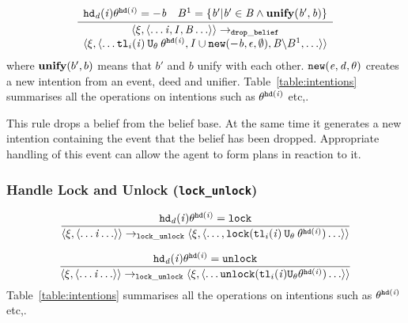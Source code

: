 \begin{equation}
\frac{
\begin{array}{c}
\mathit{{\tt hd}_d}(\mathit{i})\theta^{{\tt hd}(\mathit{i})} = -\mathit{b} \quad
B^1 = \{\mathit{b}' | \mathit{b}' \in \mathit{B} \wedge
\mbox{{\bf unify}}(\mathit{b}', \mathit{b})\}
\end{array}
}{
\begin{array}{c}
\langle \xi, \langle \ldots \mathit{i}, \mathit{I}, \mathit{B} \ldots \rangle \rangle \rightarrow_{\tt drop\_belief} \\
\langle \xi, \langle \ldots
{\tt tl}_i(\mathit{i})\: {\tt U}_{\theta} \:
\theta^{{\tt hd}(\mathit{i})},
\mathit{I} \cup {\tt new}(\mathit{-\mathit{b}}, \epsilon, \emptyset) ,
\mathit{B} \backslash B^1, \ldots \rangle  \rangle
\end{array}
}
\end{equation}
where $\mbox{{\bf unify}}(b', b)$ means that $b'$ and $b$ unify with each other.   ${\tt new}(\mathit{e}, \mathit{d}, \theta)$ creates a new intention from an event, deed and unifier.  Table~\ref{table:intentions} summarises all the operations on intentions such as $\theta^{{\tt hd}(\mathit{i})}$ etc,.

This rule drops a belief from the belief base.  At the same time it generates a new intention containing the event that the belief has been dropped.  Appropriate handling of this event can allow the agent to form plans in reaction to it.


\subsubsection*{Handle Lock and Unlock ({\tt lock\_unlock})}

\begin{equation}
\frac{\mathit{{\tt hd}_d}(\mathit{i})\theta^{{\tt hd}(\mathit{i})} = {\tt lock}
}{\langle \xi, \langle \ldots \mathit{i} \ldots \rangle \rangle \rightarrow_{\tt lock\_unlock}
  \langle \xi, \langle
\ldots, {\tt lock}({\tt tl}_i(\mathit{i}) \: {\tt U}_{\theta} \: \theta^{{\tt hd}(\mathit{i})}) \ldots \rangle \rangle }
\end{equation}

\begin{equation}
\frac{\mathit{{\tt hd}_d}(\mathit{i})\theta^{{\tt hd}(\mathit{i})}  =  {\tt unlock}
}{\langle \xi, \langle \ldots \mathit{i} \ldots \rangle \rangle \rightarrow_{\tt lock\_unlock}
  \langle \xi, \langle \ldots
 {\tt unlock}({\tt tl}_i(\mathit{i}) {\tt U}_{\theta} \theta^{{\tt hd}(\mathit{i})}) \ldots \rangle \rangle }
\end{equation}
Table~\ref{table:intentions} summarises all the operations on intentions such as $\theta^{{\tt hd}(\mathit{i})}$ etc,.

